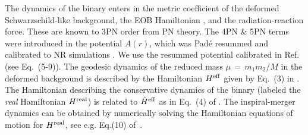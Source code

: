 The dynamics of the binary enters in the metric coefficient of the deformed
Schwarzschild-like background, the EOB Hamiltonian \cite{EOBOriginalBuonannoDamour}, 
and the radiation-reaction force. 
These
are known to 3PN order \cite{EOBOriginalBuonannoDamour,PadeAD} from PN theory.
The 4PN \& 5PN terms were introduced in the potential $A(r)$, which was 
Pad\'{e} resummed and calibrated to NR simulations
\citep{EOBNRdevel01,EOBNRdevel02,EOBNRdevel03,EOBNRdevel04,BuonannoEOBv2Main}.
We use the resummed potential calibrated in Ref.~\cite{BuonannoEOBv2Main} 
(see Eq.~(5-9)). The geodesic dynamics of the reduced mass 
$\mu\,=\,m_1 m_2 / M$ in the deformed background 
is described by
the Hamiltonian $H^{\mathrm{eff}}$ given by Eq.~(3) in \cite{BuonannoEOBv2Main}.
The Hamiltonian describing the conservative dynamics of the binary
(labeled the \textit{real} Hamiltonian $H^{\mathrm{real}}$) is related to 
$\hat{H}^{\mathrm{eff}}$ as in Eq.~(4) of \cite{BuonannoEOBv2Main}.
The inspiral-merger dynamics can be obtained by numerically solving the 
Hamiltonian equations of motion for $H^{\mathrm{real}}$, see e.g. Eq.(10)
of~\cite{BuonannoEOBv2Main}. 

